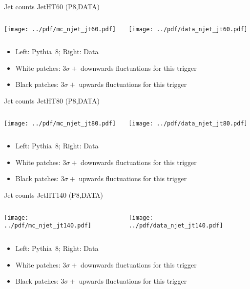 \documentclass[9pt]{beamer}
\begin{document}
\begin{frame}[t]{Jet counts JetHT60 (P8,DATA)}
\begin{columns}[T]
  \begin{column}{.5\textwidth}
  \texttt{[image: ../pdf/mc\_njet\_jt60.pdf]}
  \end{column}
  \begin{column}{.5\textwidth}
  \texttt{[image: ../pdf/data\_njet\_jt60.pdf]}
  \end{column}
\end{columns}
\begin{itemize}
 \item Left: Pythia~8; Right: Data
 \item White patches: $3\sigma+$ downwards fluctuations for this trigger
 \item Black patches: $3\sigma+$ upwards fluctuations for this trigger
\end{itemize}
\end{frame}

\begin{frame}[t]{Jet counts JetHT80 (P8,DATA)}
\begin{columns}[T]
  \begin{column}{.5\textwidth}
  \texttt{[image: ../pdf/mc\_njet\_jt80.pdf]}
  \end{column}
  \begin{column}{.5\textwidth}
  \texttt{[image: ../pdf/data\_njet\_jt80.pdf]}
  \end{column}
\end{columns}
\begin{itemize}
 \item Left: Pythia~8; Right: Data
 \item White patches: $3\sigma+$ downwards fluctuations for this trigger
 \item Black patches: $3\sigma+$ upwards fluctuations for this trigger
\end{itemize}
\end{frame}

\begin{frame}[t]{Jet counts JetHT140 (P8,DATA)}
\begin{columns}[T]
  \begin{column}{.5\textwidth}
  \texttt{[image: ../pdf/mc\_njet\_jt140.pdf]}
  \end{column}
  \begin{column}{.5\textwidth}
  \texttt{[image: ../pdf/data\_njet\_jt140.pdf]}
  \end{column}
\end{columns}
\begin{itemize}
 \item Left: Pythia~8; Right: Data
 \item White patches: $3\sigma+$ downwards fluctuations for this trigger
 \item Black patches: $3\sigma+$ upwards fluctuations for this trigger
\end{itemize}
\end{frame}
\end{document}
